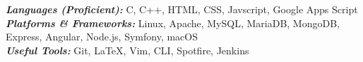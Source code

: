 

\begin{cvparagraph}
  \textbf{\textit{Languages (Proficient): }} C, C++, HTML, CSS, Javscript, Google Apps Script\\
  \textbf{\textit{Platforms \& Frameworks: }}Linux, Apache, MySQL, MariaDB, MongoDB, Express, Angular, Node.js, Symfony, macOS \\
  \textbf{\textit{Useful Tools: }}Git, \LaTeX, Vim, CLI, Spotfire, Jenkins
\end{cvparagraph}
